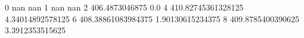 0 nan nan
1 nan nan
2 406.4873046875 0.0
4 410.82745361328125 4.34014892578125
6 408.38861083984375 1.90130615234375
8 409.8785400390625 3.3912353515625
